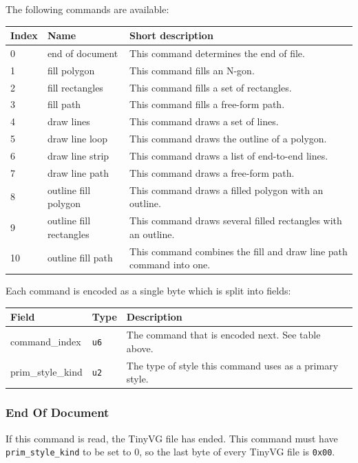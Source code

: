 \documentclass[]{article}
\begin{document}
The following commands are available:

\begin{longtable}[]{@{}p{0.5in}p{1.25in}p{4.25in}@{}}
\toprule
Index & Name & Short description \\
\midrule
\endhead
0 & end of document & This command determines the end of file. \\
1 & fill polygon & This command fills an N-gon. \\
2 & fill rectangles & This command fills a set of rectangles. \\
3 & fill path & This command fills a free-form path. \\
4 & draw lines & This command draws a set of lines. \\
5 & draw line loop & This command draws the outline of a polygon. \\
6 & draw line strip & This command draws a list of end-to-end lines. \\
7 & draw line path & This command draws a free-form path. \\
8 & outline fill polygon & This command draws a filled polygon with an outline. \\
9 & outline fill rectangles & This command draws several filled rectangles with an outline. \\
10 & outline fill path & This command combines the fill and draw line path command into one. \\
\bottomrule
\end{longtable}

Each command is encoded as a single byte which is split into fields:

\begin{longtable}[]{@{}p{1.5in}p{0.5in}p{4in}@{}}
\toprule
Field & Type & Description \\
\midrule
\endhead
command\_index    & \texttt{u6} & The command that is encoded next. See table above. \\
prim\_style\_kind & \texttt{u2} & The type of style this command uses as a primary style. \\
\bottomrule
\end{longtable}

\hypertarget{end-of-document}{\subsubsection{End Of Document}\label{end-of-document}}

If this command is read, the TinyVG file has ended. This command must
have \texttt{prim\_style\_kind} to be set to 0, so the last byte of
every TinyVG file is \texttt{0x00}.
\end{document}
